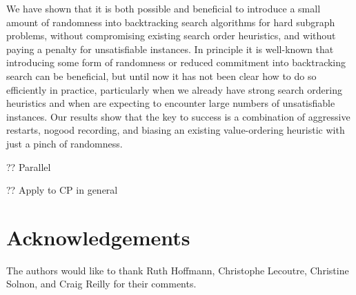 \documentclass[runningheads]{llncs}
\begin{document}
We have shown that it is both possible and beneficial to introduce a small amount of randomness into
backtracking search algorithms for hard subgraph problems, without compromising existing search
order heuristics, and without paying a penalty for unsatisfiable instances. In principle it is
well-known that introducing some form of randomness \cite{DBLP:conf/aaai/GomesSK98} or reduced
commitment \cite{DBLP:conf/ijcai/HarveyG95} into backtracking search can be beneficial, but until
now it has not been clear how to do so efficiently in practice, particularly when we already have
strong search ordering heuristics and when are expecting to encounter large numbers of unsatisfiable
instances. Our results show that the key to success is a combination of aggressive restarts, nogood
recording, and biasing an existing value-ordering heuristic with just a pinch of randomness.

?? Parallel

?? Apply to CP in general

\section*{Acknowledgements}

The authors would like to thank Ruth Hoffmann, Christophe Lecoutre, Christine Solnon, and Craig
Reilly for their comments.



\end{document}
